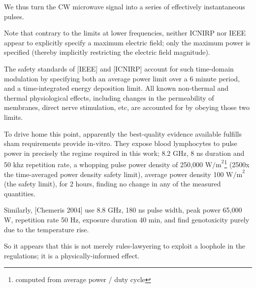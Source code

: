 \documentclass[fleqn,10pt]{article}
\begin{document}
We thus turn the CW microwave signal into a series of effectively instantaneous pulses.

Note that contrary to the limits at lower frequencies, neither ICNIRP nor IEEE appear to explicitly specify a maximum electric field; only the maximum power is specified (thereby implicitly restricting the electric field magnitude).

The safety standards of [IEEE] and [ICNIRP] account for such time-domain modulation by specifying both an average power limit over a 6 minute period, and a time-integrated energy deposition limit. All known non-thermal and thermal physiological effects, including changes in the permeability of membranes, direct nerve stimulation, etc, are accounted for by obeying those two limits.

To drive home this point, apparently the best-quality evidence available fulfills sham requirements provide in-vitro. They expose blood lymphocytes to pulse power in precisely the regime required in this work; 8.2 GHz, 8 ns duration and 50 khz repetition rate, a whopping pulse power density of 250,000 $\text{W/m}^2$\footnote{computed from average power / duty cycle} (2500x the time-averaged power density safety limit), average power density 100 $\text{W/m}^2$ (the safety limit), for 2 hours, finding no change in any of the measured quantities. 

Similarly, [Chemeris 2004] use 8.8 GHz, 180 ns pulse width, peak power 65,000 W, repetition rate 50 Hz, exposure duration 40 min, and find genotoxicity purely due to the temperature rise.

So it appears that this is not merely rules-lawyering to exploit a loophole in the regulations; it is a physically-informed effect.
\end{document}
